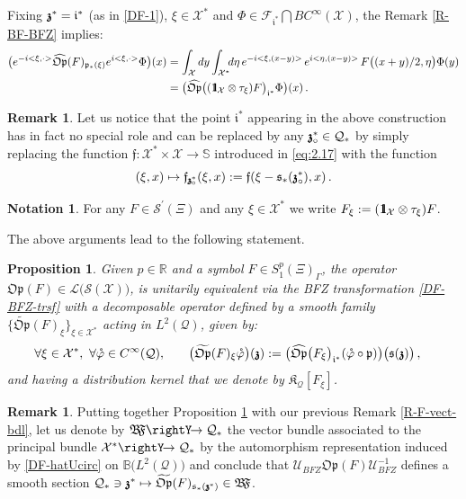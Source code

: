 \documentclass[12pt]{article}
\newtheorem{proposition}[theorem]{Proposition}
\theoremstyle{definition}
\newtheorem{remark}[theorem]{Remark}
\newtheorem{notation}[theorem]{Notation}
\def\R{\mathbb{R}}
\def\Op{\mathfrak{Op}}
\def\X{\mathcal X}
\def\U{\mathcal{U}}
\def\T{\mathcal{Q}}
\def\bb1{{\rm{1}\hspace{-3pt}\mathbf{l}}}
\def\p{\mathfrak{p}}
\def\s{\mathfrak{s}}
\def\bz{\mathfrak{z}\hspace*{-4pt}\mathfrak{z}}
\def\repi{\rightY\hspace*{-4pt}\rightarrow}
\numberwithin{equation}{section}
\begin{document}
Fixing $\bz^*=\mathfrak{i}^*$ (as in \eqref{DF-1}), $\xi\in\X^*$ and $\Phi\in\mathscr{F}_{\mathfrak{i}^*}\bigcap{BC}^\infty(\X)$, the Remark \ref{R-BF-BFZ} implies:
\begin{align}\label{DF-OpABFZ}
	\big(e^{-i<\xi,\cdot>}\widehat{\Op}(F)_{\p_*(\xi)}e^{i<\xi,\cdot>}\Phi\big)(x)&=\int_{\X}dy\int_{\X^*}\hspace*{-4pt}d\eta\,e^{-i<\xi,(x-y)>}\,e^{i<\eta,(x-y)>}\,F\big((x+y)/2,\eta\big)\Phi(y)\nonumber \\
	&=\big(\widehat{\Op}\big((\bb1_{\X}\otimes\tau_{\xi})F\big)_{\mathfrak{i}^*}\Phi\big)(x)\,.
\end{align}

\begin{remark}\label{R-1}
	Let us notice that the point $\mathfrak{i}^*$ appearing in the above construction has in fact no special role and can be replaced by any $\bz^*_\circ\in\T_*$ by simply replacing the function $\mathfrak{f}:\X^*\times\X\rightarrow\mathbb{S}$ introduced in \eqref{eq:2.17}  with the function $$(\xi,x) \mapsto \mathfrak{f}_{\bz^*_\circ}(\xi,x):=\mathfrak{f}(\xi-\s_*(\bz^*_\circ),x)\,.$$
\end{remark}

\begin{notation}\label{N-60}
	For any $F\in\mathscr{S}^\prime(\Xi)$ and any $\xi\in\X^*$ we write $ F_\xi:=(\bb1_{\X}\otimes\tau_{\xi})F$.
\end{notation}
The above arguments lead to  the following statement.
\begin{proposition}\label{P-60}
Given $p\in\R$ and  a symbol $F\in{S}^p_1(\Xi)_{\Gamma}$, the operator $\Op(F)\in\mathcal{L}\big(\mathscr{S}(\X)\big)$, is unitarily equivalent via the BFZ transformation \eqref{DF-BFZ-trsf} with a decomposable operator defined by a smooth family $\big\{\widetilde{\Op}(F)_{\xi}\big\}_{\xi\in\X^*}$ acting in $L^2(\T)$, given by:
\begin{align}\label{DF-OpA-L2T}
	\forall\xi\in\X^*,\ \forall\mathring{\varphi}\in{C}^\infty(\T),\qquad&\big(\widetilde{\Op}(F)_{\xi}\mathring{\varphi}\big)(\bz):=\big(\widehat{\Op}\big(F_{\xi}\big)_{\mathfrak{i}^*}(\mathring{\varphi}\circ\p)\big){ \big(\s(\bz)\big)}\,,
\end{align}
and having a distribution kernel that we denote by $\mathfrak{K}_{\T}[F_\xi]$. 
\end{proposition}

\begin{remark}
Putting together Proposition \ref{P-60} with our previous Remark \ref{R-F-vect-bdl}, let us denote by $\mathfrak{B\hspace*{-2pt}F}\repi\T_*$ the vector bundle associated to the principal bundle $\X^*\repi\T_*$ by the automorphism representation induced by \eqref{DF-hatUcirc} on $\mathbb{B}\big(L^2(\T)\big)$ and conclude that $\U_{BFZ}\Op(F)\U_{BFZ}^{-1}$ defines a smooth section $\T_*\ni\bz^*\mapsto\widetilde{\Op}(F)_{\s_*(\bz^*)}\in\mathfrak{B\hspace*{-2pt}F}$.
\end{remark}
\end{document}
